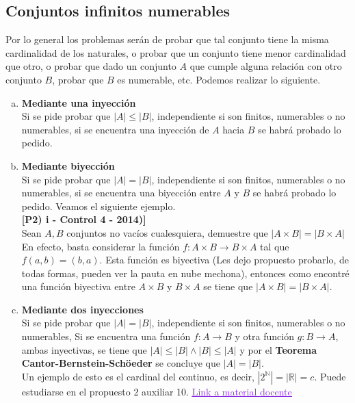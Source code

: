 \documentclass[letterpaper,12pt]{article}
\newcommand{\R}{\mathbb R}
\newcommand{\N}{\mathbb N}
\theoremstyle{plain}
\begin{document}
\subsection{Conjuntos infinitos numerables}
Por lo general los problemas serán de probar que tal conjunto tiene la misma cardinalidad de los naturales, o probar que un conjunto tiene menor cardinalidad que otro, o probar que dado un conjunto $A$ que cumple alguna relación con otro conjunto $B$, probar que $B$ es numerable, etc.
Podemos realizar lo siguiente.
\begin{enumerate}[a)]
    \item \textbf{Mediante una inyección}\\
        Si se pide probar que $|A|\leq |B|$, independiente si son finitos, numerables o no numerables, si se encuentra una inyección de $A$ hacia $B$ se habrá probado lo pedido.
        
        
    \item \textbf{Mediante biyección}\\
        Si se pide probar que $|A|=|B|$, independiente si son finitos, numerables o no numerables, si se encuentra una biyección entre $A$ y $B$ se habrá probado lo pedido. Veamos el siguiente ejemplo.\\
        \textbf{[P2) i - Control 4 - 2014)]}\\
        Sean $A, B$ conjuntos no vacíos cualesquiera, demuestre que $|A\times B|=|B\times A|$\\
        En efecto, basta considerar la función $f: A\times B \to B\times A$ tal que $f(a,b)=(b,a)$. Esta función es biyectiva (Les dejo propuesto probarlo, de todas formas, pueden ver la pauta en nube mechona), entonces como encontré una función biyectiva entre $A\times B$ y $B\times A$ se tiene que $|A\times B|=|B\times A|$.
        
    \item \textbf{Mediante dos inyecciones}\\
        Si se pide probar que $|A|=|B|$, independiente si son finitos, numerables o no numerables, Si se encuentra una función $f:A \to B$ y otra función $g:B \to A$, ambas inyectivas, se tiene que $|A|\leq |B| \land |B|\leq|A|$ y por el \textbf{Teorema Cantor-Bernstein-Schöeder} se concluye que $|A|=|B|$. \\
        
        Un ejemplo de esto es el cardinal del continuo, es decir, $|2^{\N}|=|\R|=c$. Puede estudiarse en el propuesto 2 auxiliar 10. \href{https://www.u-cursos.cl/ingenieria/2017/1/MA1101/1/material_docente/}{\textcolor{BlueViolet}{\underline{Link a material docente}}}
        

\end{enumerate}
\end{document}
